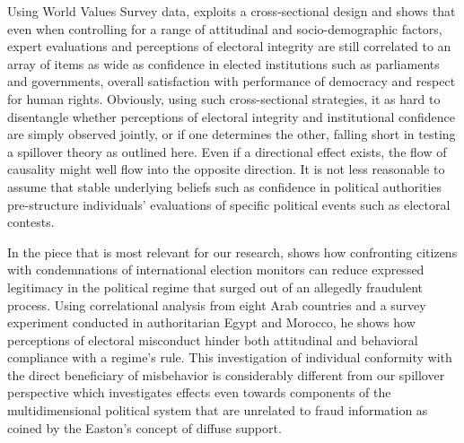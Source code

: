\documentclass[11pt, ngerman,english,a4]{article}
\begin{document}
Using World Values Survey data, \citet{Norris2014, Norris2019} exploits a cross-sectional design and shows that even when controlling for a range of attitudinal and socio-demographic factors, expert evaluations and perceptions of electoral integrity are still correlated to an array of items as wide as confidence in elected institutions such as parliaments and governments, overall satisfaction with performance of democracy and respect for human rights. Obviously, using such cross-sectional strategies, it as hard to disentangle whether perceptions of electoral integrity and institutional confidence are simply observed jointly, or if one determines the other, falling short in testing a spillover theory as outlined here.  Even if a directional effect exists, the flow of causality might well flow into the opposite direction. It is not less reasonable to assume that stable underlying beliefs such as confidence in political authorities pre-structure individuals’ evaluations of specific political events such as electoral contests. 

In the piece that is most relevant for our research, \citet{Williamson2020} shows how confronting citizens with condemnations of international election monitors can reduce expressed legitimacy in the political regime that surged out of an allegedly fraudulent process. Using correlational analysis from eight Arab countries and a survey experiment conducted in authoritarian Egypt and Morocco, he shows how perceptions of electoral misconduct hinder both attitudinal and behavioral compliance with a regime’s rule. This investigation of individual conformity with the direct beneficiary of misbehavior is considerably different from our spillover perspective which investigates effects even towards components of the multidimensional political system that are unrelated to fraud information as coined by the Easton’s concept of diffuse support. 

\end{document}

